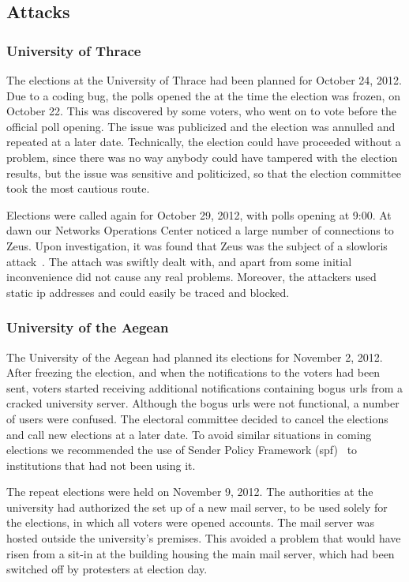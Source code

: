 \documentclass[jets]{usenixjournal}
\begin{document}
\subsection{Attacks}
\label{ssec:attacks}

\subsubsection{University of Thrace}
\label{sssec:thrace}

The elections at the University of Thrace had been planned for October
24, 2012. Due to a coding bug, the polls opened the at the time the
election was frozen, on October 22. This was discovered by some
voters, who went on to vote before the official poll opening. The
issue was publicized and the election was annulled and repeated at a
later date. Technically, the election could have proceeded without a
problem, since there was no way anybody could have tampered with the
election results, but the issue was sensitive and politicized, so that
the election committee took the most cautious route.

Elections were called again for October 29, 2012, with polls opening
at 9:00. At dawn our Networks Operations Center noticed a large number
of connections to Zeus. Upon investigation, it was found that Zeus was
the subject of a slowloris attack~\cite{slowloris}. The attach was
swiftly dealt with, and apart from some initial inconvenience did not
cause any real problems. Moreover, the attackers used static {\sc ip}
addresses and could easily be traced and blocked.

\subsubsection{University of the Aegean}

The University of the Aegean had planned its elections for November 2,
2012. After freezing the election, and when the notifications to the
voters had been sent, voters started receiving additional
notifications containing bogus {\sc url}s from a cracked university server.
Although the bogus {\sc url}s were not functional, a number of users were
confused. The electoral committee decided to cancel the elections and
call new elections at a later date. To avoid similar situations in
coming elections we recommended the use of Sender Policy Framework
({\sc spf})~\cite{rfc4408} to institutions that had not been using it.

The repeat elections were held on November 9, 2012. The authorities at
the university had authorized the set up of a new mail server, to be
used solely for the elections, in which all voters were opened
accounts. The mail server was hosted outside the university's
premises. This avoided a problem that would have risen from a sit-in
at the building housing the main mail server, which had been switched
off by protesters at election day.
\end{document}
